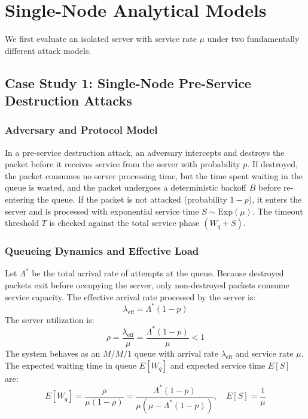 \documentclass[journal,compsoc]{IEEEtran}
\begin{document}
\section{Single-Node Analytical Models}
We first evaluate an isolated server with service rate $\mu$ under two fundamentally different attack models.

\subsection{Case Study 1: Single-Node Pre-Service Destruction Attacks}
\subsubsection{Adversary and Protocol Model}
In a pre-service destruction attack, an adversary intercepts and destroys the packet before it receives service from the server with probability $p$. If destroyed, the packet consumes no server processing time, but the time spent waiting in the queue is wasted, and the packet undergoes a deterministic backoff $B$ before re-entering the queue. If the packet is not attacked (probability $1 - p$), it enters the server and is processed with exponential service time $S \sim \text{Exp}(\mu)$. The timeout threshold $T$ is checked against the total service phase $(W_q + S)$.

\subsubsection{Queueing Dynamics and Effective Load}
Let $\Lambda^*$ be the total arrival rate of attempts at the queue. Because destroyed packets exit before occupying the server, only non-destroyed packets consume service capacity. The effective arrival rate processed by the server is:
\begin{equation}
\lambda_{\text{eff}} = \Lambda^*(1 - p)
\end{equation}
The server utilization is:
\begin{equation}
\rho = \frac{\lambda_{\text{eff}}}{\mu} = \frac{\Lambda^*(1 - p)}{\mu} < 1
\end{equation}
The system behaves as an $M/M/1$ queue with arrival rate $\lambda_{\text{eff}}$ and service rate $\mu$. The expected waiting time in queue $E[W_q]$ and expected service time $E[S]$ are:
\begin{equation}
E[W_q] = \frac{\rho}{\mu(1 - \rho)} = \frac{\Lambda^*(1 - p)}{\mu(\mu - \Lambda^*(1 - p))}, \quad E[S] = \frac{1}{\mu}
\end{equation}
\end{document}
